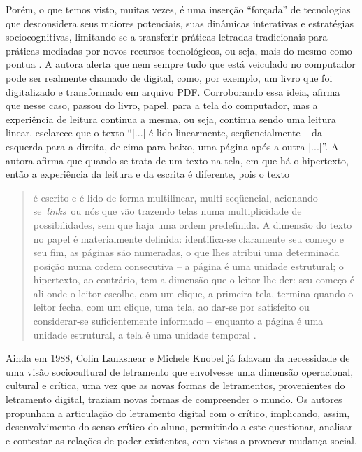 \documentclass{textolivre}
\begin{document}
Porém, o que temos visto, muitas vezes, é uma inserção “forçada” de tecnologias
que desconsidera seus maiores potenciais, suas dinâmicas interativas e
estratégias sociocognitivas, limitando-se a transferir práticas letradas
tradicionais para práticas mediadas por novos recursos tecnológicos, ou seja,
mais do mesmo como pontua \textcite{barreto2017}. A autora alerta que nem sempre tudo
que está veiculado no computador pode ser realmente chamado de digital, como,
por exemplo, um livro que foi digitalizado e transformado em arquivo PDF.
Corroborando essa ideia, \textcite{rojo2016} afirma que nesse caso, passou do livro,
papel, para a tela do computador, mas a experiência de leitura continua a
mesma, ou seja, continua sendo uma leitura linear. \textcite[p. 150]{soares2002}
esclarece que o texto “[...] é lido linearmente, seqüencialmente – da esquerda
para a direita, de cima para baixo, uma página após a outra [...]”. A autora
afirma que quando se trata de um texto na tela, em que há o hipertexto, então a
experiência da leitura e da escrita é diferente, pois o texto
\begin{quote}
é escrito e é lido de forma multilinear, multi-seqüencial,
acionando-se \emph{links} ou nós que vão trazendo telas numa multiplicidade de
possibilidades, sem que haja uma ordem predefinida. A dimensão do texto no
papel é materialmente definida: identifica-se claramente seu começo e seu fim,
as páginas são numeradas, o que lhes atribui uma determinada posição numa ordem
consecutiva – a página é uma unidade estrutural; o hipertexto, ao contrário,
tem a dimensão que o leitor lhe der: seu começo é ali onde o leitor escolhe,
com um clique, a primeira tela, termina quando o leitor fecha, com um clique,
uma tela, ao dar-se por satisfeito ou considerar-se suficientemente informado –
enquanto a página é uma unidade estrutural, a tela é uma unidade temporal
\cite[p. 150]{soares2002}.
\end{quote}

Ainda em 1988, Colin Lankshear e Michele Knobel já falavam da necessidade de
uma visão sociocultural de letramento que envolvesse uma dimensão operacional,
cultural e crítica, uma vez que as novas formas de letramentos, provenientes do
letramento digital, traziam novas formas de compreender o mundo. Os autores
propunham a articulação do letramento digital com o crítico, implicando, assim,
desenvolvimento do senso crítico do aluno, permitindo a este questionar,
analisar e contestar as relações de poder existentes, com vistas a provocar
mudança social.
\end{document}
